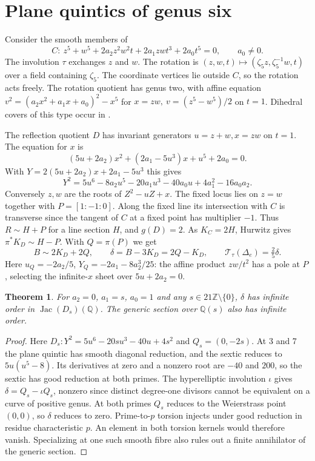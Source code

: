 \documentclass[11pt]{article}
\newtheorem{theorem}{Theorem}[section]
\newcommand{\Jac}{\operatorname{Jac}}
\newcommand{\Q}{\mathbb Q}
\begin{document}
\section{Plane quintics of genus six}
Consider the smooth members of
\begin{equation}\label{quintic}
 C:\ z^5+w^5+2a_2z^2w^2t+2a_1zwt^3+2a_0t^5=0,\qquad a_0\ne0 .
\end{equation}
The involution $\tau$ exchanges $z$ and $w$. The rotation is
$(z,w,t)\mapsto(\zeta_5z,\zeta_5^{-1}w,t)$ over a field containing
$\zeta_5$. The coordinate vertices lie outside $C$, so the rotation acts
freely. The rotation quotient has genus two, with affine equation
$v^2=(a_2x^2+a_1x+a_0)^2-x^5$ for $x=zw,\ v=(z^5-w^5)/2$ on $t=1$.
Dihedral covers of this type occur in \cite{AP}.

The reflection quotient $D$ has invariant generators $u=z+w,x=zw$
on $t=1$. The equation for $x$ is
\[
 (5u+2a_2)x^2+(2a_1-5u^3)x+u^5+2a_0=0.
\]
With $Y=2(5u+2a_2)x+2a_1-5u^3$ this gives
\begin{equation}\label{sextic}
 Y^2=5u^6-8a_2u^5-20a_1u^3-40a_0u+4a_1^2-16a_0a_2 .
\end{equation}
Conversely $z,w$ are the roots of $Z^2-uZ+x$. The fixed locus lies on
$z=w$ together with $P=[1:-1:0]$. Along the fixed line its intersection
with $C$ is transverse since the tangent of $C$ at a fixed point has
multiplier $-1$. Thus $R\sim H+P$ for a line section $H$, and $g(D)=2$.
As $K_C=2H$, Hurwitz gives $\pi^*K_D\sim H-P$. With $Q=\pi(P)$ we get
\begin{equation}\label{class}
 B\sim2K_D+2Q,\qquad \delta=B-3K_D=2Q-K_D,\qquad
 \mathcal T_\tau(\Delta_e)=\tfrac25\delta .
\end{equation}
Here $u_Q=-2a_2/5$, $Y_Q=-2a_1-8a_2^3/25$: the affine product
$zw/t^2$ has a pole at $P$, selecting the infinite-$x$ sheet over
$5u+2a_2=0$.

\begin{theorem}\label{points}
For $a_2=0$, $a_1=s$, $a_0=1$ and any $s\in21\mathbb Z\setminus\{0\}$,
$\delta$ has infinite order in $\Jac(D_s)(\Q)$. The generic section over
$\Q(s)$ also has infinite order.
\end{theorem}
\begin{proof}
Here $D_s:Y^2=5u^6-20su^3-40u+4s^2$ and $Q_s=(0,-2s)$.
At 3 and 7 the plane quintic has smooth diagonal reduction, and the
sextic reduces to $5u(u^5-8)$. Its derivatives at zero and a nonzero
root are $-40$ and $200$, so the sextic has good reduction at both primes.
The hyperelliptic involution $\iota$ gives $\delta=Q_s-\iota Q_s$,
nonzero since distinct degree-one divisors cannot be equivalent on
a curve of positive genus. At both primes $Q_s$ reduces to the
Weierstrass point $(0,0)$, so $\delta$ reduces to zero. Prime-to-$p$
torsion injects under good reduction in residue characteristic $p$.
An element in both torsion kernels would therefore vanish. Specializing at
one such smooth fibre also rules out a finite annihilator of the generic
section.
\end{proof}
\end{document}
